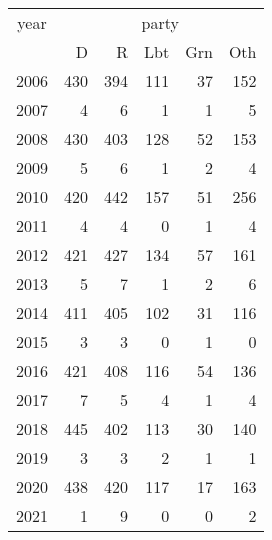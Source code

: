 \footnotesize\begin{tabular}[t]{lrrrrr}
\toprule
\multicolumn{1}{c}{year} & \multicolumn{5}{c}{party} \\
\cmidrule(l{3pt}r{3pt}){1-1} \cmidrule(l{3pt}r{3pt}){2-6}
  & D & R & Lbt & Grn & Oth\\
\midrule
2006 & 430 & 394 & 111 & 37 & 152\\
2007 & 4 & 6 & 1 & 1 & 5\\
2008 & 430 & 403 & 128 & 52 & 153\\
2009 & 5 & 6 & 1 & 2 & 4\\
2010 & 420 & 442 & 157 & 51 & 256\\
2011 & 4 & 4 & 0 & 1 & 4\\
2012 & 421 & 427 & 134 & 57 & 161\\
2013 & 5 & 7 & 1 & 2 & 6\\
2014 & 411 & 405 & 102 & 31 & 116\\
2015 & 3 & 3 & 0 & 1 & 0\\
2016 & 421 & 408 & 116 & 54 & 136\\
2017 & 7 & 5 & 4 & 1 & 4\\
2018 & 445 & 402 & 113 & 30 & 140\\
2019 & 3 & 3 & 2 & 1 & 1\\
2020 & 438 & 420 & 117 & 17 & 163\\
2021 & 1 & 9 & 0 & 0 & 2\\
\bottomrule
\end{tabular}
